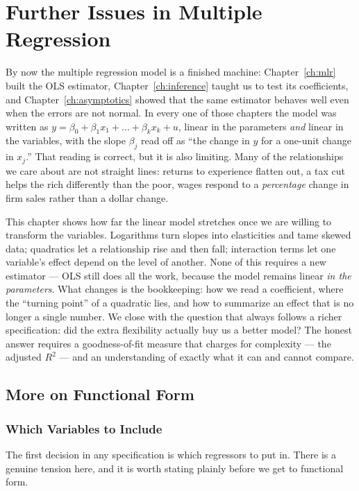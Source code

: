 \chapter{Further Issues in Multiple Regression}
\label{ch:further}

By now the multiple regression model is a finished machine: Chapter~\ref{ch:mlr} built the OLS estimator, Chapter~\ref{ch:inference} taught us to test its coefficients, and Chapter~\ref{ch:asymptotics} showed that the same estimator behaves well even when the errors are not normal. In every one of those chapters the model was written as $y = \beta_0 + \beta_1 x_1 + \dots + \beta_k x_k + u$, linear in the parameters \emph{and} linear in the variables, with the slope $\beta_j$ read off as ``the change in $y$ for a one-unit change in $x_j$.'' That reading is correct, but it is also limiting. Many of the relationships we care about are not straight lines: returns to experience flatten out, a tax cut helps the rich differently than the poor, wages respond to a \emph{percentage} change in firm sales rather than a dollar change.

This chapter shows how far the linear model stretches once we are willing to transform the variables. Logarithms turn slopes into elasticities and tame skewed data; quadratics let a relationship rise and then fall; interaction terms let one variable's effect depend on the level of another. None of this requires a new estimator --- OLS still does all the work, because the model remains linear \emph{in the parameters}. What changes is the bookkeeping: how we read a coefficient, where the ``turning point'' of a quadratic lies, and how to summarize an effect that is no longer a single number. We close with the question that always follows a richer specification: did the extra flexibility actually buy us a better model? The honest answer requires a goodness-of-fit measure that charges for complexity --- the adjusted $R^2$ --- and an understanding of exactly what it can and cannot compare.

\section{More on Functional Form}

\subsection{Which Variables to Include}

The first decision in any specification is which regressors to put in. There is a genuine tension here, and it is worth stating plainly before we get to functional form.

